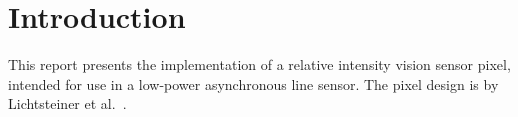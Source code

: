 \section{Introduction}
This report presents the implementation of a relative intensity vision sensor pixel, intended for use in 
a low-power asynchronous line sensor. 
The pixel design is by Lichtsteiner et al.~\cite{Lichtsteiner2008}.

